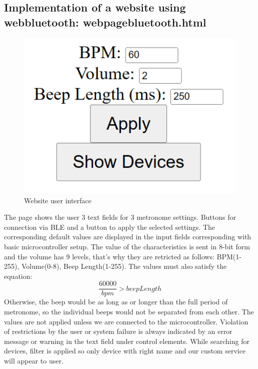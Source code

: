 \documentclass[a4paper, 11pt, twocolumn]{article}
\begin{document}
    \subsection{Implementation of a website using webbluetooth: webpage\textunderscore bluetooth.html}
    \begin{figure}[ht]
		\centering
		\includegraphics[width=0.8 \linewidth]{webpage_screen.png}

		\caption{Website user interface}
		\label{fig:webpage}
	\end{figure}
 
    The page shows the user 3 text fields for 3 metronome settings. Buttons for connection via BLE
    and a button to apply the selected settings. The corresponding default values are displayed in the input fields corresponding
    with basic microcontroller setup. The value of the characteristics is sent in 8-bit form and the volume has 9 levels, that's why they are
    retricted as follows: BPM(1-255), Volume(0-8), Beep Length(1-255). The values must also satisfy the equation:
    \[\frac{60000}{bpm} > beepLength\] Otherwise, the beep would be as long as or longer than the full period of
    metronome, so the individual beeps would not be separated from each other. The values are not applied unless we are connected to the microcontroller.
    Violation of restrictions by the user or system failure is always indicated by an error message or warning in the text field under
    control elements. While searching for devices, filter is applied so only device with right name and our custom service will appear to user.

\end{document}

